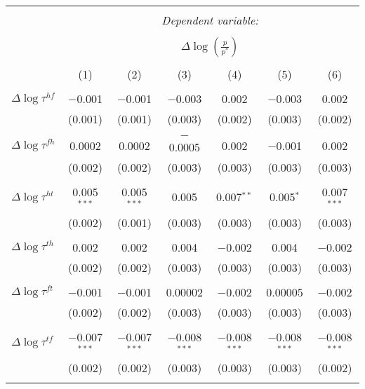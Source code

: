 
\begin{tabular}{@{\extracolsep{5pt}}lcccccc} 
\\[-1.8ex]\hline 
\hline \\[-1.8ex] 
 & \multicolumn{6}{c}{\textit{Dependent variable:}} \\ 
\cline{2-7} 
\\[-1.8ex] & \multicolumn{6}{c}{$\Delta \log \left(\frac{p}{p^*} \right)$} \\ 
\\[-1.8ex] & (1) & (2) & (3) & (4) & (5) & (6)\\ 
\hline \\[-1.8ex] 
 $\Delta \log \tau^{hf}$ & $-$0.001 & $-$0.001 & $-$0.003 & 0.002 & $-$0.003 & 0.002 \\ 
  & (0.001) & (0.001) & (0.003) & (0.002) & (0.003) & (0.002) \\ 
  & & & & & & \\ 
 $\Delta \log \tau^{fh}$ & 0.0002 & 0.0002 & $-$0.0005 & 0.002 & $-$0.001 & 0.002 \\ 
  & (0.002) & (0.002) & (0.003) & (0.003) & (0.003) & (0.003) \\ 
  & & & & & & \\ 
 $\Delta \log \tau^{ht}$ & 0.005$^{***}$ & 0.005$^{***}$ & 0.005 & 0.007$^{**}$ & 0.005$^{*}$ & 0.007$^{***}$ \\ 
  & (0.002) & (0.001) & (0.003) & (0.003) & (0.003) & (0.003) \\ 
  & & & & & & \\ 
 $\Delta \log \tau^{th}$ & 0.002 & 0.002 & 0.004 & $-$0.002 & 0.004 & $-$0.002 \\ 
  & (0.002) & (0.002) & (0.003) & (0.003) & (0.003) & (0.003) \\ 
  & & & & & & \\ 
 $\Delta \log \tau^{ft}$ & $-$0.001 & $-$0.001 & 0.00002 & $-$0.002 & 0.00005 & $-$0.002 \\ 
  & (0.002) & (0.002) & (0.003) & (0.003) & (0.003) & (0.003) \\ 
  & & & & & & \\ 
 $\Delta \log \tau^{tf}$ & $-$0.007$^{***}$ & $-$0.007$^{***}$ & $-$0.008$^{***}$ & $-$0.008$^{***}$ & $-$0.008$^{***}$ & $-$0.008$^{***}$ \\ 
  & (0.002) & (0.002) & (0.003) & (0.003) & (0.003) & (0.002) \\ 
  & & & & & & \\ 

\end{tabular}
